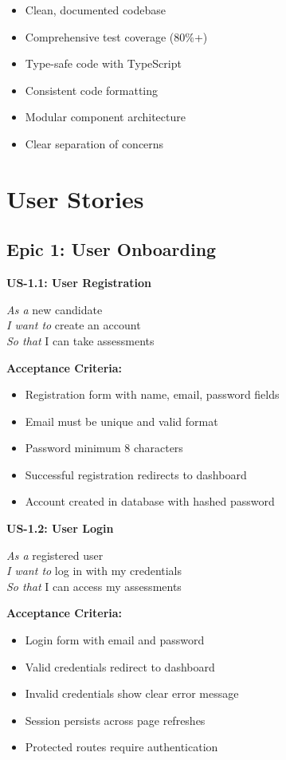 \documentclass[12pt,a4paper]{report}
\begin{document}
\begin{itemize}
    \item Clean, documented codebase
    \item Comprehensive test coverage (80\%+)
    \item Type-safe code with TypeScript
    \item Consistent code formatting
    \item Modular component architecture
    \item Clear separation of concerns
\end{itemize}

\section{User Stories}

\subsection{Epic 1: User Onboarding}

\textbf{US-1.1: User Registration}

\textit{As a} new candidate \\
\textit{I want to} create an account \\
\textit{So that} I can take assessments

\textbf{Acceptance Criteria:}
\begin{itemize}
    \item Registration form with name, email, password fields
    \item Email must be unique and valid format
    \item Password minimum 8 characters
    \item Successful registration redirects to dashboard
    \item Account created in database with hashed password
\end{itemize}

\textbf{US-1.2: User Login}

\textit{As a} registered user \\
\textit{I want to} log in with my credentials \\
\textit{So that} I can access my assessments

\textbf{Acceptance Criteria:}
\begin{itemize}
    \item Login form with email and password
    \item Valid credentials redirect to dashboard
    \item Invalid credentials show clear error message
    \item Session persists across page refreshes
    \item Protected routes require authentication
\end{itemize}
\end{document}
